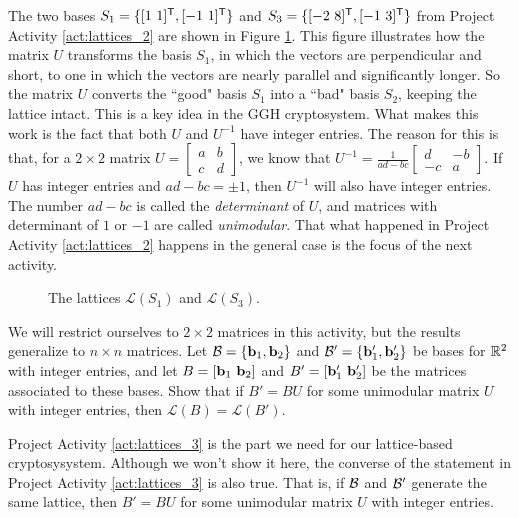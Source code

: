 The two bases $S_1 = \{[1 \ 1]^{\tr}, [-1 \ 1]^{\tr}\}$ and $S_3 =\{[-2 \ 8]^{\mathsf{T}}, [-1 \ 3]^{\mathsf{T}}\}$ from Project Activity \ref{act:lattices_2} are shown in Figure \ref{F:Lattice_3}. This figure illustrates how the matrix $U$ transforms the basis $S_1$, in which the vectors are perpendicular and short, to one in which the vectors are nearly parallel and significantly longer. So the matrix $U$ converts the ``good" basis $S_1$ into a ``bad" basis $S_2$, keeping the lattice intact. This is a key idea in the GGH cryptosystem. What makes this work is the fact that both $U$ and $U^{-1}$ have integer entries. The reason for this is that, for a $2 \times 2$ matrix $U = \left[ \begin{array}{cc} a&b\\c&d \end{array} \right]$, we know that $U^{-1} = \frac{1}{ad-bc} \left[  \begin{array}{rr} d&-b\\-c&a \end{array} \right]$. If $U$ has integer entries and $ad-bc = \pm 1$, then $U^{-1}$ will also have integer entries. The number $ad-bc$ is called the \emph{determinant} of $U$, and matrices with determinant of $1$ or $-1$ are called \emph{unimodular}. That what happened in Project Activity \ref{act:lattices_2} happens in the general case is the focus of the next activity.
\begin{figure}[h]
\begin{center}
\caption{The lattices $\mathcal{L}(S_1)$ and $\mathcal{L}(S_3)$.}
\label{F:Lattice_3}
\end{center}
\end{figure}



\begin{pactivity} \label{act:lattices_3} We will restrict ourselves to $2 \times 2$ matrices in this activity, but the results generalize to $n \times n$ matrices. Let $\mathcal{B} = \{\mathbf{b}_1, \mathbf{b}_2\}$ and $\mathcal{B}' = \{\mathbf{b}'_1, \mathbf{b}'_2\}$ be bases for $\mathbb{R}^2$ with integer entries, and let $B = [\mathbf{b}_1 \ \mathbf{b}_2]$ and $B' = [\mathbf{b}'_1 \ \mathbf{b}'_2]$ be the matrices associated to these bases. Show that if $B' = BU$ for some unimodular matrix $U$ with integer entries, then $\mathcal{L}(B) = \mathcal{L}(B')$.


\end{pactivity}

Project Activity \ref{act:lattices_3} is the part we need for our lattice-based cryptosysystem. Although we won't show it here, the converse of the statement in Project Activity \ref{act:lattices_3} is also true. That is, if $\mathcal{B}$ and $\mathcal{B}'$ generate the same lattice, then $B' = BU$ for some unimodular matrix $U$ with integer entries.


